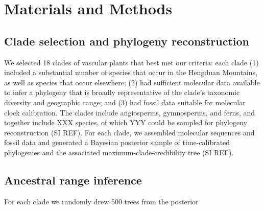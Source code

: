 \section{Materials and Methods}

\subsection{Clade selection and phylogeny reconstruction}

We selected 18 clades of vascular plants that best met our criteria: each clade (1) included a substantial number of species that occur in the Hengduan Mountains, as well as species that occur elsewhere; (2) had sufficient molecular data available to infer a phylogeny that is broadly representative of the clade's taxonomic diversity and geographic range; and (3) had fossil data suitable for molecular clock calibration. The clades include angiosperms, gymnosperms, and ferns, and together include XXX species, of which YYY could be sampled for phylogeny reconstruction (SI REF). For each clade, we assembled molecular sequences and fossil data and generated a Bayesian posterior sample of time-calibrated phylogenies and the associated maximum-clade-credibility tree (SI REF).

\subsection{Ancestral range inference}

For each clade we randomly drew 500 trees from the posterior